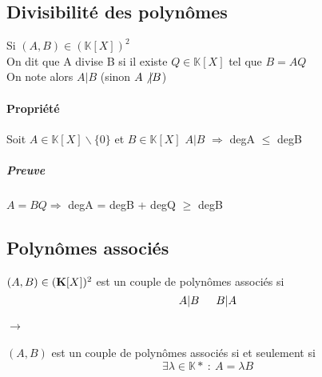 		\subsection{Divisibilité des polynômes}
			Si $(A,B) \in (\mathbb{K} [X])^{2}$\\
			On dit que A	 divise B si il existe $Q \in\mathbb{K} [X]$ tel que $B=AQ$\\
			On note alors $A\vert B$ (sinon $A\not\vert B$)
			\paragraph{Propriété}
				Soit $A\in\mathbb{K} [X] \backslash\{0\}$ et $B \in\mathbb{K} [X]$
				$A\vert B$ $\Rightarrow$ degA $\leq$ degB
				\subparagraph{Preuve}
				 $A = BQ \Rightarrow$ degA = degB + degQ $\geq$ degB
		\subsection{Polynômes associés}
			$(A,B) \in ({\mathbf{K}[X]} )^2$ est un couple de polynômes associés si
			\[A\vert B \hspace*{15pt} B\vert A\]
			\paragraph{$\rightarrow$}
				$(A,B)$ est un couple de polynômes associés si et seulement si
				\[\exists\lambda\in\mathbb{K}* ~:~A=\lambda B\]
